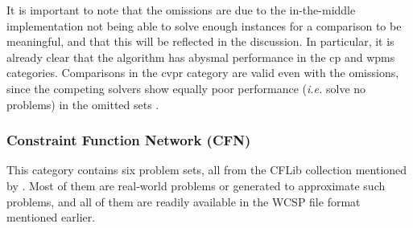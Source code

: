 It is important to note that the omissions are due to the in-the-middle implementation not being able to solve enough instances for a comparison to be meaningful, and that this will be reflected in the discussion.
In particular, it is already clear that the algorithm has abysmal performance in the \gls{cp} and \gls{wpms} categories.
Comparisons in the \gls{cvpr} category are valid even with the omissions, since the competing solvers show equally poor performance (\emph{i.e.} solve no problems) in the omitted sets \textcite[\pno~9]{deGivry14}.

\subsubsection{Constraint Function Network (CFN)}
This category contains six problem sets, all from the CFLib collection mentioned by \textcite[\pno~3]{deGivry14}.
Most of them are real-world problems or generated to approximate such problems, and all of them are readily available in the \textsc{WCSP} file format mentioned earlier.

